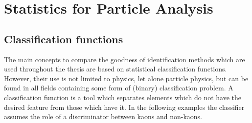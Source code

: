 \chapter{Statistics for Particle Analysis}
\label{chap:statistics}

\section{Classification functions}
\label{sec:classification_functions}

The main concepts to compare the goodness of identification methods which are used throughout the thesis are based on statistical classification functions. However, their use is not limited to physics, let alone particle physics, but can be found in all fields containing some form of (binary) classification problem. A classification function is a tool which separates elements which do not have the desired feature from those which have it.
In the following examples the classifier assumes the role of a discriminator between kaons and non-kaons.

